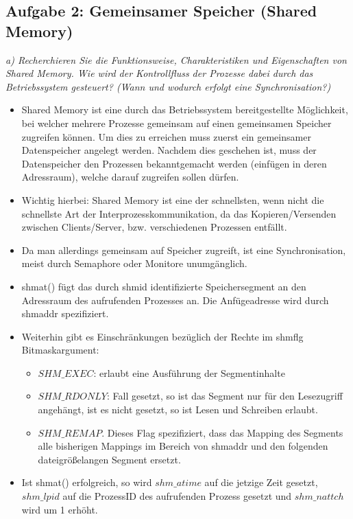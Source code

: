 \documentclass[a4paper]{article}
\begin{document}
\subsection{Aufgabe 2: Gemeinsamer Speicher (Shared Memory)}
\textit{a) Recherchieren Sie die Funktionsweise, Charakteristiken und Eigenschaften von Shared Memory. Wie wird der Kontrollfluss der Prozesse dabei durch das Betriebssystem gesteuert? (Wann und wodurch erfolgt eine Synchronisation?)}
\vspace{10mm}
\begin{itemize}
    \item Shared Memory ist eine durch das Betriebssystem bereitgestellte Möglichkeit, bei welcher mehrere Prozesse gemeinsam auf einen gemeinsamen Speicher zugreifen können. Um dies zu erreichen muss zuerst ein gemeinsamer Datenspeicher angelegt werden. Nachdem dies geschehen ist, muss der Datenspeicher den Prozessen bekanntgemacht werden (einfügen in deren Adressraum), welche darauf zugreifen sollen dürfen. 
    \item Wichtig hierbei: Shared Memory ist eine der schnellsten, wenn nicht die schnellste Art der Interprozesskommunikation, da das Kopieren/Versenden zwischen Clients/Server, bzw. verschiedenen Prozessen entfällt. 
    \item Da man allerdings gemeinsam auf Speicher zugreift, ist eine Synchronisation, meist durch Semaphore oder Monitore unumgänglich. 
    \item shmat() fügt das durch shmid identifizierte Speichersegment an den Adressraum des aufrufenden Prozesses an. Die Anfügeadresse wird durch shmaddr spezifiziert. 
    \item Weiterhin gibt es Einschränkungen bezüglich der Rechte im shmflg Bitmaskargument: 
    \begin{itemize}
        \item $SHM\_EXEC$: erlaubt eine Ausführung der Segmentinhalte
        \item $SHM\_RDONLY$: Fall gesetzt, so ist das Segment nur für den Lesezugriff angehängt, ist es nicht gesetzt, so ist Lesen und Schreiben erlaubt. 
        \item $SHM\_REMAP$. Dieses Flag spezifiziert, dass das Mapping des Segments alle bisherigen Mappings im Bereich von shmaddr und den folgenden dateigrößelangen Segment ersetzt. 
    \end{itemize}
\item Ist shmat() erfolgreich, so wird $shm\_atime$ auf die jetzige Zeit gesetzt, $shm\_lpid$ auf die ProzessID des aufrufenden Prozess gesetzt und $shm\_nattch$ wird um 1 erhöht.
\end{itemize}
\end{document}
